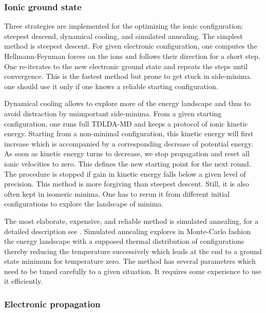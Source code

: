 \documentclass[final,1p]{elsarticle}
\begin{document}
\subsubsection{Ionic ground state}
\label{sec:numstaticion}


Three strategies are implemented for the optimizing the ionic
configuration: steepest descend, dynamical cooling, and simulated
annealing. The simplest method is steepest descent. For given
electronic configuration, one computes the Hellmann-Feynman forces on
the ions and follows their direction for a short step. One re-iterates
to the new electronic ground state and repeats the steps until
convergence. This is the fastest method but prone to get stuck in
side-minima. one should use it only if one knows a reliable starting
configuration. 

Dynamical cooling allows to explore more of the energy landscape and
thus to avoid distraction by unimportant side-minima. From a given
starting configuration, one runs full TDLDA-MD and keeps a protocol of
ionic kinetic energy. Starting from a non-minimal configuration, this
kinetic energy will first increase which is accompanied by a
corresponding decrease of potential energy. As soon as kinetic energy
turns to decrease, we stop propagation and reset all ionic velocities
to zero. This defines the new starting point for the next round.
The procedure is stopped if gain in kinetic energy falls below a given
level of precision. This method is more forgiving than steepest
descent. Still, it is also often kept in isomeric minima. One has to
rerun it from different initial configurations to explore the
landscape of minima.


The most elaborate, expensive, and reliable method is simulated
annealing, for a detailed description see \cite{Pre92}.  Simulated
annealing explores in Monte-Carlo fashion the energy landscape with a
supposed thermal distribution of configurations thereby reducing the
temperature successively which leads at the end to a ground state
minimum for temperature zero. The method has several parameters which
need to be tuned carefully to a given situation. It requires some
experience to use it efficiently.



\subsubsection{Electronic propagation}
\label{sec:numdynel}
\end{document}
